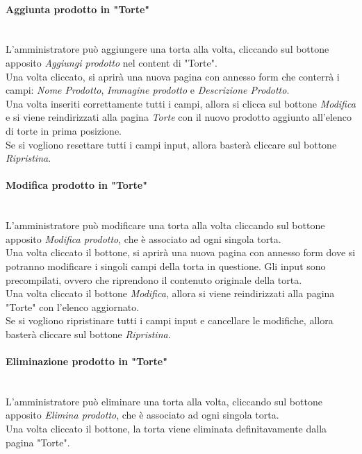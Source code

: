 \paragraph{Aggiunta prodotto in "Torte"}\mbox{}\\
\label{par:AddT}
L'amministratore può aggiungere una torta alla volta, cliccando sul bottone apposito \emph{Aggiungi prodotto} nel content di "Torte".\\
Una volta cliccato, si aprirà una nuova pagina con annesso form che conterrà i campi: \emph{Nome Prodotto}, \emph{Immagine prodotto} e \emph{Descrizione Prodotto}.\\ 
Una volta inseriti correttamente tutti i campi, allora si clicca sul bottone \emph{Modifica} e si viene reindirizzati alla pagina \emph{Torte} con il nuovo prodotto 
aggiunto all'elenco di torte in prima posizione.\\
Se si vogliono resettare tutti i campi input, allora basterà cliccare sul bottone \emph{Ripristina}.

\paragraph{Modifica prodotto in "Torte"}\mbox{}\\
\label{par:ModT}
L'amministratore può modificare una torta alla volta cliccando sul bottone apposito \emph{Modifica prodotto}, che è associato ad ogni singola torta.\\ 
Una volta cliccato il bottone, si aprirà una nuova pagina con annesso form dove si potranno modificare i singoli campi della torta in questione. 
Gli input sono precompilati, ovvero che riprendono il contenuto originale della torta.\\
Una volta cliccato il bottone \emph{Modifica}, allora si viene reindirizzati alla pagina "Torte" con l'elenco aggiornato.\\
Se si vogliono ripristinare tutti i campi input e cancellare le modifiche, allora basterà cliccare sul bottone \emph{Ripristina}.

\paragraph{Eliminazione prodotto in "Torte"}\mbox{}\\
\label{par:DelT}
L'amministratore può eliminare una torta alla volta, cliccando sul bottone apposito \emph{Elimina prodotto}, che è associato ad ogni singola torta.\\ 
Una volta cliccato il bottone, la torta viene eliminata definitavamente dalla pagina "Torte".\\

